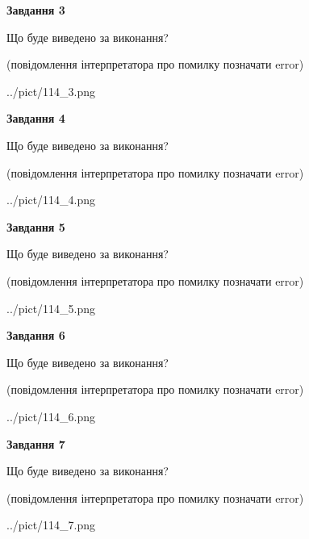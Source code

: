 \documentclass[12pt, ukrainian]{article}
\begin{document}
{\begin {large}
{\begin {center}\textbf{Завдання 3}\end {center}}\par
Що буде виведено за виконання?\par
 (повідомлення інтерпретатора про помилку позначати error)\par
\begin{center}
	{../pict/114_3.png}
\end{center}
\newpage

{\begin {center}\textbf{Завдання 4}\end {center}}\par
Що буде виведено за виконання?\par
 (повідомлення інтерпретатора про помилку позначати error)\par
\begin{center}
	{../pict/114_4.png}
\end{center}
\newpage

{\begin {center}\textbf{Завдання 5}\end {center}}\par
Що буде виведено за виконання?\par
 (повідомлення інтерпретатора про помилку позначати error)\par
\begin{center}
	{../pict/114_5.png}
\end{center}
\newpage

{\begin {center}\textbf{Завдання 6}\end {center}}\par
Що буде виведено за виконання?\par
 (повідомлення інтерпретатора про помилку позначати error)\par
\begin{center}
	{../pict/114_6.png}
\end{center}
\newpage

{\begin {center}\textbf{Завдання 7}\end {center}}\par
Що буде виведено за виконання?\par
 (повідомлення інтерпретатора про помилку позначати error)\par
\begin{center}
	{../pict/114_7.png}
\end{center}
\newpage


\end{large}}
\end{document}
